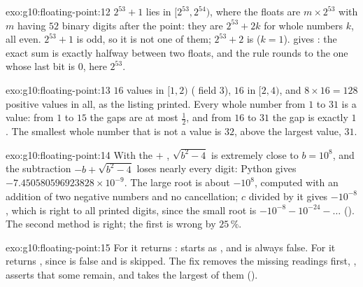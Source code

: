 \begin{solution}{exo:g10:floating-point:12}
$2^{53} + 1$ lies in $[2^{53}, 2^{54})$, where the floats are $m \times 2^{53}$ with $m$ having $52$ binary digits after
the point: they are $2^{53} + 2k$ for whole numbers $k$, all even. $2^{53} + 1$ is odd, so it is not one of them;
$2^{53} + 2$ is ($k = 1$).  gives : the exact sum is exactly halfway between
two floats, and the rule rounds to the one whose last bit is $0$, here $2^{53}$.
\end{solution}

\begin{solution}{exo:g10:floating-point:13}
$16$ values in $[1, 2)$ ( field $3$), $16$ in $[2, 4)$, and $8 \times 16 = 128$ positive values in all, as the
listing printed. Every whole number from $1$ to $31$ is a value: from $1$ to $15$ the gaps are at most $\tfrac12$,
and from $16$ to $31$ the gap is exactly $1$. The smallest whole number that is not a value is $32$, above the
largest value, $31$.
\end{solution}

\begin{solution}{exo:g10:floating-point:14}
With the $+$ , $\sqrt{b^2 - 4} $ is extremely close to $b = 10^8$, and the subtraction $-b + \sqrt{b^2 - 4}$ loses
nearly every digit: Python gives $-7.450580596923828 \times 10^{-9}$. The large root is about $-10^8$, computed with
an addition of two negative numbers and no cancellation; $c$ divided by it gives $-10^{-8}$, which is right to all
printed digits, since the small root is $-10^{-8} - 10^{-24} - \dots$ (). The second
method is right; the first is wrong by $25\,\%$.
\end{solution}

\begin{solution}{exo:g10:floating-point:15}
For \code{[nan, 3.0, 7.0]} it returns :  starts as , and  is always false.
For \code{[3.0, nan, 7.0]} it returns , since  is false and  is skipped. The fix
removes the missing readings first, , asserts that some
remain, and takes the largest of them ().
\end{solution}

